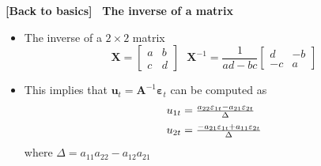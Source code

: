 \documentclass[10pt,handout]{beamer}
\begin{document}
\begin{frame}
{{\footnotesize \textbf{[Back to basics]}} \textbf{\ {The inverse of a
matrix } }}

\begin{itemize}
\item The inverse of a $2\times 2$ matrix 
\begin{equation*}
\mathbf{X}=%
\begin{bmatrix}
a & b \\ 
c & d%
\end{bmatrix}%
\text{\ \ \ \ \ \ }\mathbf{X}^{-1}=\frac{1}{ad-bc}%
\begin{bmatrix}
d & -b \\ 
-c & a%
\end{bmatrix}%
\end{equation*}%
\pause

\item This implies that $\mathbf{u}_{t}=\mathbf{A}^{-1}\mathbf{\varepsilon }%
_{t}$ can be computed as%
\begin{equation*}
\begin{array}{l}
u_{1t}=\frac{a_{22}\varepsilon _{1t}-a_{21}\varepsilon _{2t}}{\Delta }%
\medskip \\ 
u_{2t}=\frac{-a_{21}\varepsilon _{1t}+a_{11}\varepsilon _{2t}}{\Delta }%
\end{array}%
\end{equation*}%
where $\Delta =a_{11}a_{22}-a_{12}a_{21}$
\end{itemize}
\end{frame}

\everymath\expandafter{\the\everymath \color{title!80}}
\everydisplay\expandafter{\the\everydisplay \color{title!80}}%
\end{document}
